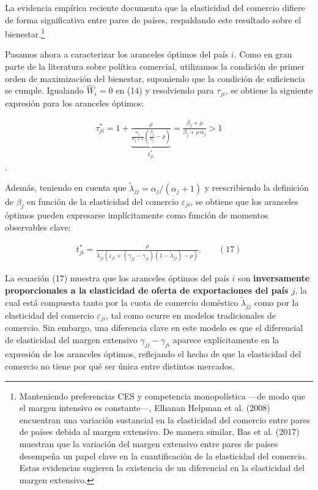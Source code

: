 \documentclass[10pt,a4paper]{article}
\begin{document}
La evidencia empírica reciente documenta que la elasticidad del comercio difiere de forma significativa entre pares de países, respaldando este resultado sobre el bienestar.\footnote{%
    Manteniendo preferencias CES y competencia monopolística —de modo que el margen intensivo es constante—, Elhanan Helpman et al. (2008) encuentran una variación sustancial en la elasticidad del comercio entre pares de países debida al margen extensivo. De manera similar, Bas et al. (2017) muestran que la variación del margen extensivo entre pares de países desempeña un papel clave en la cuantificación de la elasticidad del comercio. Estas evidencias sugieren la existencia de un diferencial en la elasticidad del margen extensivo.
}


Pasamos ahora a caracterizar los aranceles óptimos del país $i$. Como en gran parte de la literatura sobre política comercial, utilizamos la condición de primer orden de maximización del bienestar, suponiendo que la condición de suficiencia se cumple. Igualando $\hat{W}_i = 0$ en (14) y resolviendo para $\tau_{ji}$, se obtiene la siguiente expresión para los aranceles óptimos:

$$\begin{aligned}
    \tau_{ji}^* = 1 +\underbrace{\frac{\rho}{\frac{\alpha_j}{\alpha_j+1}\left(\frac{\beta_j}{\alpha_j}-\rho\right)}}_{t_{ji}^*}=\frac{\beta_j+\rho}{\beta_j+\rho\,\alpha_j}>1
\end{aligned}$$.

Además, teniendo en cuenta que $\tilde{\lambda}_{jj} = \alpha_j / (\alpha_j + 1)$ y reescribiendo la definición de $\beta_j$ en función de la elasticidad del comercio $\varepsilon_{ji}$, se obtiene que los aranceles óptimos pueden expresarse implícitamente como función de momentos observables clave:

$$\begin{aligned}
    t_{ji}^* =\frac{{\rho}}{\tilde{\lambda}_{jj}(\varepsilon_{ji} + (\gamma_{jj} - \gamma_{ji})(1 - \tilde{\lambda}_{jj}) - \rho)}.\qquad (17)
\end{aligned}$$

La ecuación (17) muestra que los aranceles óptimos del país $i$ son \textbf{inversamente proporcionales a la elasticidad de oferta de exportaciones del país $j$}, la cual está compuesta tanto por la cuota de comercio doméstico $\tilde{\lambda}_{jj}$ como por la elasticidad del comercio $\varepsilon_{ji}$, tal como ocurre en modelos tradicionales de comercio. Sin embargo, una diferencia clave en este modelo es que el diferencial de elasticidad del margen extensivo $\gamma_{jj} - \gamma_{ji}$ aparece explícitamente en la expresión de los aranceles óptimos, reflejando el hecho de que la elasticidad del comercio no tiene por qué ser única entre distintos mercados.
\end{document}
